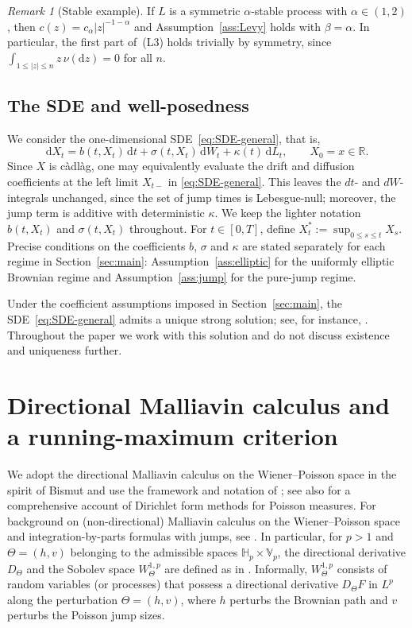 \documentclass[11pt]{article}
\newcommand{\R}{\mathbb{R}}
\newcommand{\Hb}{\mathbb{H}}
\newcommand{\Vb}{\mathbb{V}}
\newcommand{\1}{\mathbf{1}}
\newcommand{\dd}{\mathrm{d}}
\newcommand{\dt}{\,\dd t}
\newcommand{\Xstar}{X^{\ast}}
\theoremstyle{plain}
\theoremstyle{definition}
\theoremstyle{remark}
\newtheorem{remark}[theorem]{Remark}
\begin{document}
\begin{remark}[Stable example]
If $L$ is a symmetric $\alpha$-stable process with $\alpha\in(1,2)$, then
$c(z)=c_\alpha |z|^{-1-\alpha}$ and Assumption~\ref{ass:Levy} holds with $\beta=\alpha$.
In particular, the first part of~(L3) holds trivially by symmetry, since $\int_{1\le|z|\le n}z\,\nu(\dd z)=0$ for all $n$.
\end{remark}

\subsection{The SDE and well-posedness}


We consider the one-dimensional SDE~\eqref{eq:SDE-general}, that is,
\begin{equation*}
\dd X_t=b(t,X_t)\dt+\sigma(t,X_t)\,\dd W_t+\kappa(t)\,\dd L_t,\qquad X_0=x\in\R.
\end{equation*}
Since $X$ is c\`adl\`ag, one may equivalently evaluate the drift and diffusion coefficients at the left limit $X_{t-}$ in \eqref{eq:SDE-general}.
This leaves the $dt$- and $dW$-integrals unchanged, since the set of jump times is Lebesgue-null; moreover, the jump term is additive with deterministic $\kappa$.
We keep the lighter notation $b(t,X_t)$ and $\sigma(t,X_t)$ throughout.
For $t\in[0,T]$, define $\Xstar_t:=\sup_{0\le s\le t}X_s$.
Precise conditions on the coefficients $b$, $\sigma$ and $\kappa$ are stated separately
for each regime in Section~\ref{sec:main}:
Assumption~\ref{ass:elliptic} for the uniformly elliptic Brownian regime and
Assumption~\ref{ass:jump} for the pure-jump regime.

Under the coefficient assumptions imposed in Section~\ref{sec:main}, the SDE~\eqref{eq:SDE-general} admits a unique strong solution; see, for instance, \cite{Applebaum2009}. Throughout the paper we work with this solution and do not discuss existence and uniqueness further.

\section{Directional Malliavin calculus and a running-maximum criterion}\label{sec:malliavin}


We adopt the directional Malliavin calculus on the Wiener--Poisson space in the spirit of Bismut
and use the framework and notation of \cite{NakagawaSuzuki2024};
see also \cite{BouleauDenis2015} for a comprehensive account of Dirichlet form methods for Poisson measures.
For background on (non-directional) Malliavin calculus on the Wiener--Poisson space and integration-by-parts formulas with jumps, see \cite{BallyClement2011,IshikawaKunita2006,Ishikawa2023}.
In particular, for $p>1$ and $\Theta=(h,v)$ belonging to the admissible spaces
$\Hb_p\times \Vb_p$, the directional derivative $D_\Theta$ and the Sobolev space $W^{1,p}_\Theta$
are defined as in \cite[Definition~3.1]{NakagawaSuzuki2024}.
Informally, $W^{1,p}_\Theta$ consists of random variables (or processes) that possess a directional
derivative $D_\Theta F$ in $L^p$ along the perturbation $\Theta=(h,v)$,
where $h$ perturbs the Brownian path and $v$ perturbs the Poisson jump sizes.
\end{document}
